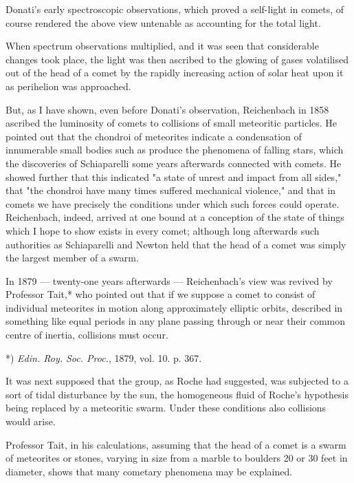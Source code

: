 \documentclass[a4paper, 12pt, oneside, polutonikogreek, english]{article}
\begin{document}
Donati's early spectroscopic observations, which proved a self-light in comets, of course rendered the above view untenable as accounting for the total light.

When spectrum observations multiplied, and it was seen that considerable changes took place, the light was then ascribed to the glowing of gases volatilised out of the head of a comet by the rapidly increasing action of solar heat upon it as perihelion was approached.

But, as I have shown, even before Donati's observation, Reichenbach in 1858 ascribed the luminosity of comets to collisions of small meteoritic particles. He pointed out that the chondroi of meteorites indicate a condensation of innumerable small bodies such as produce the phenomena of falling stars, which the discoveries of Schiaparelli some years afterwards connected with comets. He showed further that this indicated "a state of unrest and impact from all sides," that "the chondroi have many times suffered mechanical violence," and that in comets we have precisely the conditions under which such forces could operate. Reichenbach, indeed, arrived at one bound at a conception of the state of things which I hope to show exists in every comet; although long afterwards such authorities as Schiaparelli and Newton held that the head of a comet was simply the largest member of a swarm.

In 1879 --- twenty-one years afterwards --- Reichenbach's view was revived by Professor Tait,* who pointed out that if we suppose a comet to consist of individual meteorites in motion along approximately elliptic orbits, described in something like equal periods in any plane passing through or near their common centre of inertia, collisions must occur.

*) \emph{Edin. Roy. Soc. Proc.}, 1879, vol. 10. p. 367.

It was next supposed that the group, as Roche had suggested, was subjected to a sort of tidal disturbance by the sun, the homogeneous fluid of Roche's hypothesis being replaced by a meteoritic swarm. Under these conditions also collisions would arise.

Professor Tait, in his calculations, assuming that the head of a comet is a swarm of meteorites or stones, varying in size from a marble to boulders 20 or 30 feet in diameter, shows that many cometary phenomena may be explained.
\end{document}
